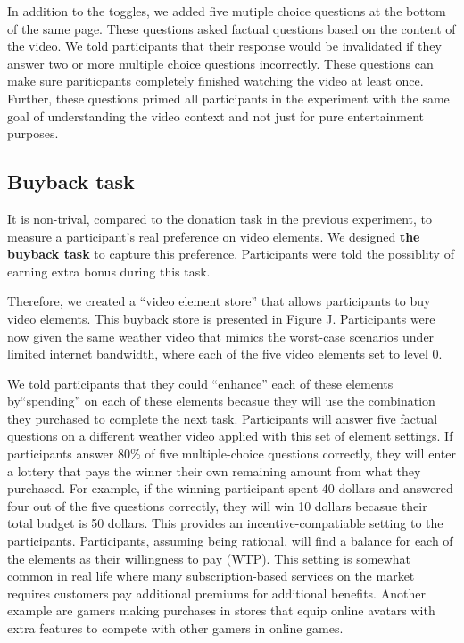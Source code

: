In addition to the toggles, we added five mutiple choice questions at the bottom of the same page. These questions asked factual questions based on the content of the video. We told participants that their response would be invalidated if they answer two or more multiple choice questions incorrectly. These questions can make sure pariticpants completely finished watching the video at least once. Further, these questions primed all participants in the experiment with the same goal of understanding the video context and not just for pure entertainment purposes.




\subsection{Buyback task}
It is non-trival, compared to the donation task in the previous experiment, to measure a participant's real preference on video elements. We designed \textbf{the buyback task} to capture this preference. Participants were told the possiblity of earning extra bonus during this task.

Therefore, we created a ``video element store'' that allows participants to buy video elements. This buyback store is presented in Figure J. Participants were now given the same weather video that mimics the worst-case scenarios under limited internet bandwidth, where each of the five video elements set to level 0. 

We told participants that they could ``enhance'' each of these elements by``spending'' on each of these elements becasue they will use the combination they purchased to complete the next task. Participants will answer five factual questions on a different weather video applied with this set of element settings. If participants answer 80\% of five multiple-choice questions correctly, they will enter a lottery that pays the winner their own remaining amount from what they purchased. For example, if the winning participant spent 40 dollars and answered four out of the five questions correctly, they will win 10 dollars becasue their total budget is 50 dollars. This provides an incentive-compatiable setting to the participants. Participants, assuming being rational, will find a balance for each of the elements as their willingness to pay (WTP). This setting is somewhat common in real life where many subscription-based services on the market requires customers pay additional premiums for additional benefits. Another example are gamers making purchases in stores that equip online avatars with extra features to compete with other gamers in online games.

